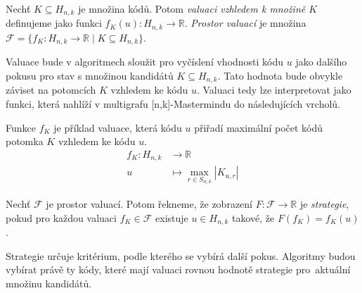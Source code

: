 \begin{definice}[Valuace]
    Nechť $K \subseteq H_{n,k}$ je množina kódů. Potom \emph{valuaci vzhledem k množině $K$} definujeme jako funkci $f_K(u) \colon H_{n,k} \to \mathbb{R}$. \emph{Prostor valuací} je množina $\mathcal{F} = \{f_K\colon H_{n,k} \to \mathbb{R} \mid K \subseteq H_{n,k}\}$.
\end{definice}


Valuace bude v algoritmech sloužit pro vyčíslení vhodnosti kódu $u$ jako dalšího pokusu pro stav s množinou kandidátů $K\subseteq H_{n,k}$. Tato hodnota bude obvykle záviset na potomcích $K$ vzhledem ke kódu $u$. Valuaci tedy lze interpretovat jako funkci, která nahlíží v multigrafu [n,k]-Mastermindu do následujících vrcholů.


\begin{prikl}\label{prjednokrokfce}
    Funkce $f_K$ je příklad valuace, která kódu $u$ přiřadí maximální počet kódů potomka $K$ vzhledem ke kódu $u$.
    \begin{align*}
        f_K \colon H_{n,k} &\to \mathbb{R} \\
        u &\mapsto \max_{r\in S_{n,k}} |K_{u,r}|
    \end{align*}
\end{prikl}


\begin{definice}[Strategie]
    Nechť $\mathcal{F}$ je prostor valuací. Potom řekneme, že zobrazení $F \colon \mathcal{F} \to \mathbb{R}$ je \emph{strategie}, pokud pro každou valuaci $f_K \in \mathcal{F}$ existuje $u\in H_{n,k}$ takové, že $F(f_K) = f_K(u)$.
\end{definice}
Strategie určuje kritérium, podle kterého se vybírá další pokus. Algoritmy budou vybírat právě ty kódy, které mají valuaci rovnou hodnotě strategie pro~aktuální množinu kandidátů. 

